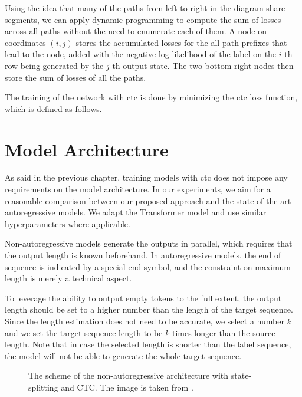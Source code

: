 Using the idea that many of the paths from left to right in the diagram share
segments, we can apply dynamic programming to compute the sum of losses across
all paths without the need to enumerate each of them. A node on coordinates
$(i,j)$ stores the accumulated losses for the all path prefixes that lead to
the node, added with the negative log likelihood of the label on the $i$-th row
being generated by the $j$-th output state. The two bottom-right nodes then
store the sum of losses of all the paths.


 The training of the network with \ac{ctc} is done by minimizing
the \ac{ctc} loss function, which is defined as follows.

\section{Model Architecture}
\label{sec:ctc:arch}

As said in the previous chapter, training models with \ac{ctc} does not impose
any requirements on the model architecture. In our experiments, we aim for a
reasonable comparison between our proposed approach and the state-of-the-art
autoregressive models. We adapt the Transformer model and use similar
hyperparameters where applicable.

Non-autoregressive models generate the outputs in parallel, which requires that
the output length is known beforehand. In autoregressive models, the end of
sequence is indicated by a special end symbol, and the constraint on maximum
length is merely a technical aspect.

To leverage the ability to output empty tokens to the full extent, the output
length should be set to a higher number than the length of the target sequence.
Since the length estimation does not need to be accurate, we select a number
$k$ and we set the target sequence length to be $k$ times longer than the
source length. Note that in case the selected length is shorter than the label
sequence, the model will not be able to generate the whole target sequence.

\begin{figure}
  \centering
  

  \caption{The scheme of the non-autoregressive architecture with
    state-splitting and CTC. The image is taken from
    \citet{libovicky-helcl-2018-end}.}%
  \label{fig:state-splitting}
\end{figure}


